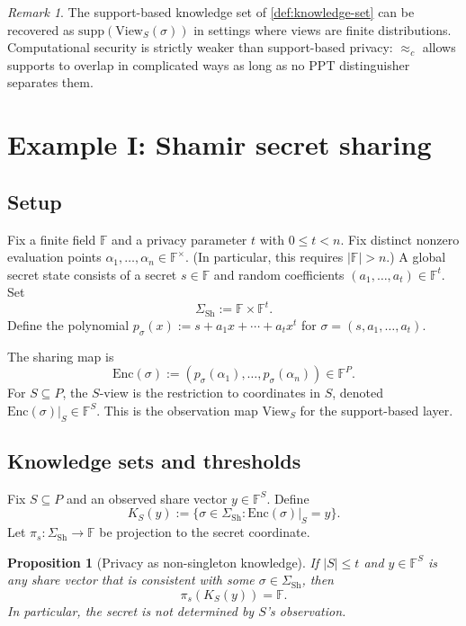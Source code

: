 \documentclass[11pt,a4paper]{article}
\newtheorem{proposition}[theorem]{Proposition}
\theoremstyle{definition}
\theoremstyle{remark}
\newtheorem{remark}[theorem]{Remark}
\newcommand{\Parties}{P}
\newcommand{\F}{\mathbb{F}}
\newcommand{\View}{\mathrm{View}}
\newcommand{\Enc}{\mathrm{Enc}}
\newcommand{\supp}{\mathrm{supp}}
\newcommand{\PPT}{\mathrm{PPT}}
\begin{document}
\begin{remark}
The support-based knowledge set of \cref{def:knowledge-set} can be recovered as \(\supp(\View_S(\sigma))\) in settings where views are finite distributions. Computational security is strictly weaker than support-based privacy: \(\approx_c\) allows supports to overlap in complicated ways as long as no \(\PPT\) distinguisher separates them.
\end{remark}

\section{Example I: Shamir secret sharing}
\label{sec:shamir}

\subsection{Setup}
Fix a finite field \(\F\) and a privacy parameter \(t\) with \(0 \le t < n\). Fix distinct nonzero evaluation points \(\alpha_1,\dots,\alpha_n\in\F^\times\). (In particular, this requires \(|\F|>n\).) A global secret state consists of a secret \(s\in\F\) and random coefficients \((a_1,\dots,a_t)\in\F^t\). Set
\[
\Sigma_{\mathrm{Sh}} := \F \times \F^t.
\]
Define the polynomial \(p_\sigma(x) := s + a_1 x + \cdots + a_t x^t\) for \(\sigma=(s,a_1,\dots,a_t)\).

The sharing map is
\[
\Enc(\sigma) := (p_\sigma(\alpha_1), \dots, p_\sigma(\alpha_n)) \in \F^{\Parties}.
\]
For \(S\subseteq \Parties\), the \(S\)-view is the restriction to coordinates in \(S\), denoted \(\Enc(\sigma)\vert_S \in \F^S\). This is the observation map \(\View_S\) for the support-based layer.

\subsection{Knowledge sets and thresholds}
Fix \(S\subseteq \Parties\) and an observed share vector \(y\in\F^S\). Define
\[
K_S(y) := \{\sigma\in\Sigma_{\mathrm{Sh}} : \Enc(\sigma)\vert_S = y\}.
\]
Let \(\pi_s : \Sigma_{\mathrm{Sh}}\to \F\) be projection to the secret coordinate.

\begin{proposition}[Privacy as non-singleton knowledge]
\label{prop:shamir-privacy}
If \(|S|\le t\) and \(y\in\F^S\) is any share vector that is consistent with some \(\sigma\in\Sigma_{\mathrm{Sh}}\), then
\[
\pi_s(K_S(y)) = \F.
\]
In particular, the secret is not determined by \(S\)'s observation.
\end{proposition}
\end{document}
